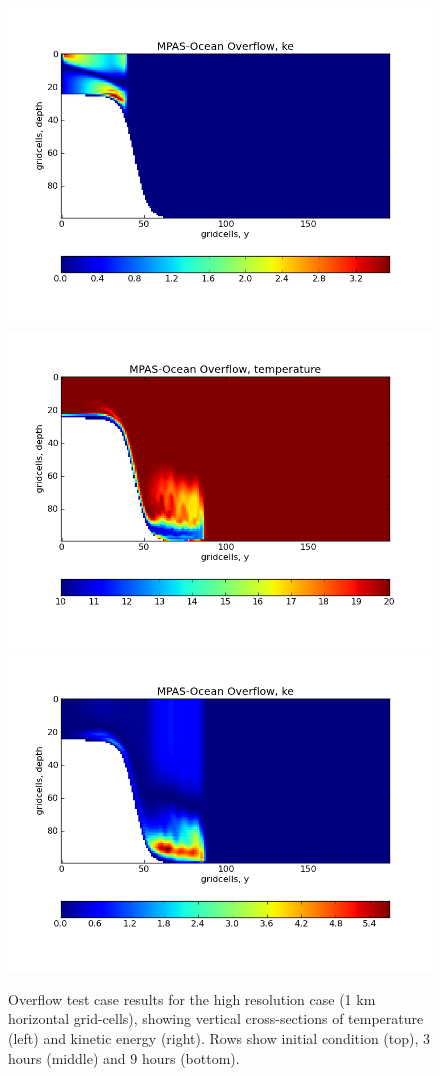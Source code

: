 \begin{figure}[H]
	\includegraphics[scale=0.4]{ocean/figures/MPAS-O_overflow_ke_3hrs.png}\\
	\includegraphics[scale=0.4]{ocean/figures/MPAS-O_overflow_temperature_9hrs.png}
	\includegraphics[scale=0.4]{ocean/figures/MPAS-O_overflow_ke_9hrs.png}
	\caption{Overflow test case results for the high resolution case (1 km horizontal grid-cells), showing vertical cross-sections of temperature (left) and kinetic energy (right).  Rows show initial condition (top), 3 hours (middle) and 9 hours (bottom).}
	\label{fig:overflow}
\end{figure}
